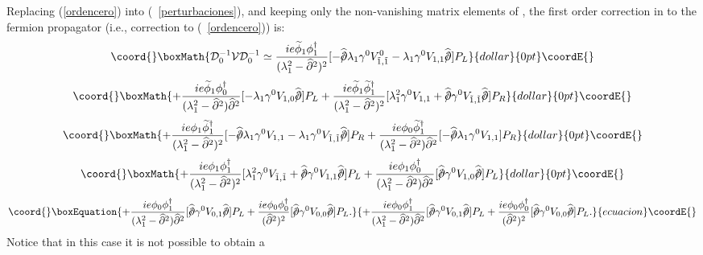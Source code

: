 \documentclass[a4paper,12pt]{article}
\begin{document}
{{Replacing (\ref{ordencero}) into (~\ref{perturbaciones}), and keeping
only the non-vanishing matrix elements of \coordHE{}, the first order
correction in \coordHE{} to the fermion propagator (i.e.,
correction to (~\ref{ordencero})) is:
$$\coord{}\boxMath{
{\mathcal D}_0 ^{-1}{\mathcal V}{\mathcal D}_0 ^{-1} \simeq
\frac{{ie\widetilde{\phi}_1 \phi^{\dagger}_1}}{{(\lambda_1^2 -
    {\widehat\partial}^2)^2}} [-\widehat{/\!\!\!\partial} \lambda_1
\gamma^0 V^0_{\tilde1,\tilde1} - \lambda_1 \gamma^0 V_{1,1}
\widehat{/\!\!\!\partial}]P_L}{dollar}{0pt}\coordE{}$$  $$\coord{}\boxMath{+\frac{{ie\widetilde{\phi}_1\phi^{\dagger}_0}}{{(\lambda_1^2-\widehat\partial^2)\widehat\partial^2}}
[-\lambda_1 \gamma^0V_{1,0} \widehat{/\!\!\!\partial}]P_L
+\frac{ie\widetilde{\phi}_1\widetilde{\phi}^{\dagger}_1}{(\lambda_1^2-\widehat\partial^2)^2}
[\lambda_1^2
\gamma^0V_{1,1}+\widehat{/\!\!\!\partial}\gamma^0V_{\tilde1,\tilde1}\widehat{/\!\!\!\partial}]P_R
}{dollar}{0pt}\coordE{}$$  $$\coord{}\boxMath{+\frac{ie\phi_1\widetilde{\phi}^{\dagger}_1}{(\lambda_1^2-\widehat
  \partial^2)^2} [-\widehat{/\!\!\!\partial} \lambda_1
\gamma^0V_{1,1}- \lambda_1 \gamma^0V_{\tilde1,\tilde1}
\widehat{/\!\!\!\partial}]P_R +
\frac{ie\phi_0\widetilde{\phi}_1^{\dagger}}{(\lambda_1^2-\widehat
  \partial^2)\widehat\partial^2} [-\widehat{/\!\!\!\partial}\lambda_1
\gamma^0V_{1,1} ]P_R}{dollar}{0pt}\coordE{}$$  $$\coord{}\boxMath{+\frac{ie\phi_1 \phi^{\dagger}_1}{(\lambda_1^2-\widehat
  \partial^2)^2} [\lambda_1^2
\gamma^0V_{\tilde1,\tilde1}+\widehat{/\!\!\!\partial}\gamma^0V_{1,1}\widehat{/\!\!\!\partial}]P_L
+ \frac{ie\phi_1 \phi^{\dagger}_0}{(\lambda_1^2-\widehat
  \partial^2)\widehat \partial^2}
[\widehat{/\!\!\!\partial}\gamma^0V_{1,0}\widehat{/\!\!\!\partial}]P_L}{dollar}{0pt}\coordE{}$$
\begin{equation}\coord{}\boxEquation{
+ \frac{i e \phi_0\phi_1^{\dagger}}{(\lambda_1^2-\widehat
\partial^2)\widehat \partial^2} [\widehat{/\!\!\!\partial}\gamma^0V_{0,1}\widehat{/\!\!\!\partial}]P_L
+ \frac{i e \phi_0\phi_0^{\dagger}}{(\widehat
\partial^2)^2}  [\widehat{/\!\!\!\partial}\gamma^0V_{0,0}\widehat{/\!\!\!\partial}]P_L.
}{
+ \frac{i e \phi_0\phi_1^{\dagger}}{(\lambda_1^2-\widehat
\partial^2)\widehat \partial^2} [\widehat{/\!\!\!\partial}\gamma^0V_{0,1}\widehat{/\!\!\!\partial}]P_L
+ \frac{i e \phi_0\phi_0^{\dagger}}{(\widehat
\partial^2)^2}  [\widehat{/\!\!\!\partial}\gamma^0V_{0,0}\widehat{/\!\!\!\partial}]P_L.
}{ecuacion}\coordE{}\end{equation}
Notice that in this case it is not possible to obtain a
}}
\end{document}
